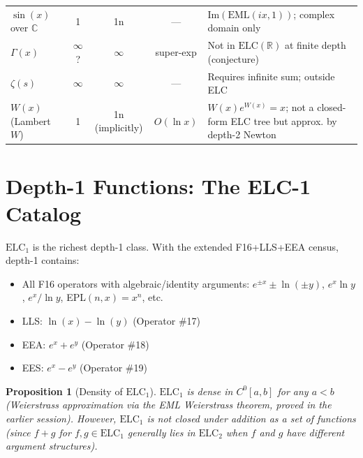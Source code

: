\documentclass[11pt]{article}
\newtheorem{proposition}[theorem]{Proposition}
\begin{document}
\begin{longtable}{lcccp{5cm}}
$\sin(x)$ over $\mathbb{C}$ & 1 & 1n & --- & $\mathrm{Im}(\mathrm{EML}(ix,1))$; complex domain only \\

$\Gamma(x)$ & $\infty$? & $\infty$ & super-exp & Not in $\mathrm{ELC}(\mathbb{R})$ at finite depth (conjecture) \\

$\zeta(s)$ & $\infty$ & $\infty$ & --- & Requires infinite sum; outside ELC \\

$W(x)$ (Lambert $W$) & 1 & 1n (implicitly) & $O(\ln x)$ & $W(x)e^{W(x)} = x$; not a closed-form ELC tree but approx. by depth-2 Newton \\

\bottomrule
\end{longtable}

\section{Depth-1 Functions: The ELC-1 Catalog}
\label{sec:depth1}

$\mathrm{ELC}_1$ is the richest depth-1 class. With the extended F16+LLS+EEA census,
depth-1 contains:

\begin{itemize}
  \item All F16 operators with algebraic/identity arguments: $e^{\pm x} \pm \ln(\pm y)$,
        $e^x \ln y$, $e^x / \ln y$, EPL$(n,x) = x^n$, etc.
  \item LLS: $\ln(x) - \ln(y)$ (Operator \#17)
  \item EEA: $e^x + e^y$ (Operator \#18)
  \item EES: $e^x - e^y$ (Operator \#19)
\end{itemize}

\begin{proposition}[Density of $\mathrm{ELC}_1$]
$\mathrm{ELC}_1$ is dense in $C^0[a,b]$ for any $a < b$ (Weierstrass approximation
via the EML Weierstrass theorem, proved in the earlier session).
However, $\mathrm{ELC}_1$ is not closed under addition as a set of functions
(since $f + g$ for $f, g \in \mathrm{ELC}_1$ generally lies in $\mathrm{ELC}_2$
when $f$ and $g$ have different argument structures).
\end{proposition}

\end{document}
